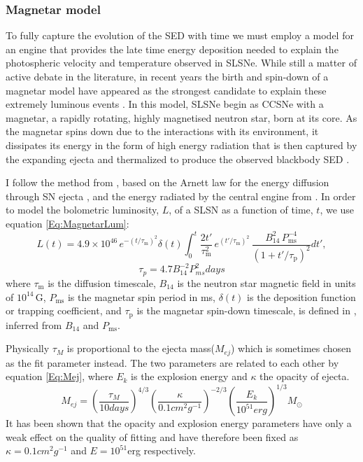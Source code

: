 \subsubsection{Magnetar model} \label{sec:Magnetar}
To fully capture the evolution of the SED with time we must employ a model for an engine that provides the late time energy deposition needed to explain the photospheric velocity and temperature observed in SLSNe. While still a matter of active debate in the literature, in recent years the birth and spin-down of a magnetar model have appeared as the strongest candidate to explain these extremely luminous events \citep{Inserra2013,Nicholl2013}. In this model, SLSNe begin as CCSNe with a magnetar, a rapidly rotating, highly magnetised neutron star, born at its core. As the magnetar spins down due to the interactions with its environment, it dissipates its energy in the form of high energy radiation that is then captured by the expanding ejecta and thermalized to produce the observed blackbody SED \citep{Kasen2009,Woosley2010,Inserra2013}.

I follow the method from \citet{Inserra2013}, based on the Arnett law for the energy diffusion through SN ejecta \citep{Arnett1982}, and the energy radiated by the central engine from \citet{Kasen2009,Woosley2010}. In order to model the bolometric luminosity, $L$, of a SLSN as a function of time, $t$, we use equation \ref{Eq:MagnetarLum}:
\begin{equation}
L(t) = 4.9\times 10^{46}\,e^{ -(t / \tau_\mathrm{m})^2 }\delta(t) \int_{0}^{t} \frac{2t'}{\tau_\mathrm{m}^2}\,e^{(t'/\tau_\mathrm{m})^2}\,\frac{B_{14}^{2}\,P_{\mathrm{ms}}^{-4}}{\left(1+t'/\tau_\mathrm{p}\right)^2} dt',
\label{Eq:MagnetarLum}
\end{equation}
\begin{equation}
\label{Eq:SDPeriod}
\tau_{p} = 4.7B_{14}^{-2}P_{ms}^{2}days
\end{equation}
\noindent where $\tau_\mathrm{m}$ is the diffusion timescale, $B_{14}$ is the neutron star magnetic field in units of $10^{14}$\,G, $P_{\mathrm{ms}}$ is the magnetar spin period in ms, $\delta(t)$ is the deposition function or trapping coefficient, and $\tau_\mathrm{p}$ is the magnetar spin-down timescale, is defined in , inferred from $B_{14}$ and $P_{\mathrm{ms}}$.

Physically $\tau_M$ is proportional to the ejecta mass($M_{ej}$) which is sometimes chosen as the fit parameter instead. The two parameters are related to each other by equation \ref{Eq:Mej}, where $E_k$ is the explosion energy and $\kappa$ the opacity of ejecta.
\begin{equation}
\label{Eq:Mej}
M_{ej} = (\frac{\tau_{M}}{10days})^{4/3}(\frac{\kappa}{0.1cm^2g^{-1}})^{-2/3}(\frac{E_k}{10^{51}erg})^{1/3}M_{\odot}
\end{equation}
\noindent It has been shown \citep{Inserra2013,Inserra2014,Nicholl2015,Papadopoulos2015} that the opacity and explosion energy parameters have only a weak effect on the quality of fitting and have therefore been fixed as $\kappa = 0.1cm^2g^{-1}$ and $E = 10^{51}$erg respectively.

